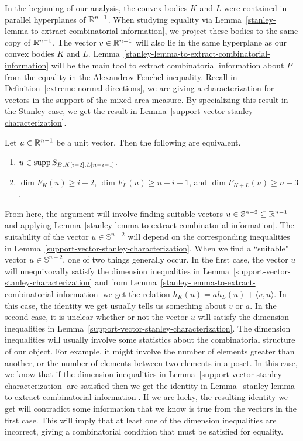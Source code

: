 \documentclass{puthesis-UG}
\begin{document}
In the beginning of our analysis, the convex bodies $K$ and $L$ were contained in parallel hyperplanes of $\mathbb{R}^{n-1}$. When studying equality via Lemma~\ref{stanley-lemma-to-extract-combinatorial-information}, we project these bodies to the same copy of $\mathbb{R}^{n-1}$. The vector $v \in \mathbb{R}^{n-1}$ will also lie in the same hyperplane as our convex bodies $K$ and $L$. Lemma~\ref{stanley-lemma-to-extract-combinatorial-information} will be the main tool to extract combinatorial information about $P$ from the equality in the Alexandrov-Fenchel inequality. Recall in Definition~\ref{extreme-normal-directions}, we are giving a characterization for vectors in the support of the mixed area measure. By specializing this result in the Stanley case, we get the result in Lemma~\ref{support-vector-stanley-characterization}. 

\begin{lem} \label{support-vector-stanley-characterization}
	Let $u \in \mathbb{R}^{n-1}$ be a unit vector. Then the following are equivalent. 
	\begin{enumerate}[label = (\alph*)]
		\item $u \in \operatorname{supp} S_{B, K[i-2], L[n-i-1]}$.

		\item $\dim F_K(u) \geq i-2$, $\dim F_L(u) \geq n-i-1$, and $\dim F_{K+L}(u) \geq n-3$. 
	\end{enumerate}
\end{lem}

From here, the argument will involve finding suitable vectors $u \in \mathbb{S}^{n-2} \subseteq \mathbb{R}^{n-1}$ and applying Lemma~\ref{stanley-lemma-to-extract-combinatorial-information}. The suitability of the vector $u \in \mathbb{S}^{n-2}$ will depend on the corresponding inequalities in Lemma~\ref{support-vector-stanley-characterization}. When we find a ``suitable" vector $u \in \mathbb{S}^{n-2}$, one of two things generally occur. In the first case, the vector $u$ will unequivocally satisfy the dimension inequalities in Lemma~\ref{support-vector-stanley-characterization} and from Lemma~\ref{stanley-lemma-to-extract-combinatorial-information} we get the relation $h_K(u) = a h_L(u) + \langle v, u \rangle$. In this case, the identity we get usually tells us something about $v$ or $a$. In the second case, it is unclear whether or not the vector $u$ will satisfy the dimension inequalities in Lemma~\ref{support-vector-stanley-characterization}. The dimension inequalities will usually involve some statistics about the combinatorial structure of our object. For example, it might involve the number of elements greater than another, or the number of elements between two elements in a poset. In this case, we know that if the dimension inequalities in Lemma~\ref{support-vector-stanley-characterization} are satisfied then we get the identity in Lemma~\ref{stanley-lemma-to-extract-combinatorial-information}. If we are lucky, the resulting identity we get will contradict some information that we know is true from the vectors in the first case. This will imply that at least one of the dimension inequalities are incorrect, giving a combinatorial condition that must be satisfied for equality. 
\end{document}
